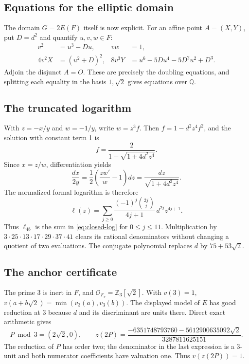 \documentclass[11pt]{article}
\theoremstyle{definition}
\newcommand{\Q}{\mathbb Q}\newcommand{\Z}{\mathbb Z}
\begin{document}
\subsection{Equations for the elliptic domain}

The domain \(G=2E(F)\) itself is now explicit. For an affine point
\(A=(X,Y)\), put \(D=d^2\) and quantify \(u,v,w\in F\):
\begin{align*}
 v^2&=u^3-Du,&vw&=1,\\
 4v^2X&=(u^2+D)^2,&
 8v^3Y&=u^6-5Du^4-5D^2u^2+D^3.
\end{align*}
Adjoin the disjunct \(A=O\). These are precisely the doubling
equations, and splitting each equality in the basis \(1,\sqrt2\)
gives equations over \(\Q\).

\subsection{The truncated logarithm}

With \(z=-x/y\) and \(w=-1/y\), write \(w=z^3f\). Then
\(f=1-d^2z^4f^2\), and the solution with constant term 1 is
\[
 f=\frac{2}{1+\sqrt{1+4d^2z^4}}.
\]
Since \(x=z/w\), differentiation yields
\[
 \frac{dx}{2y}
 =\frac12\left(\frac{zw'}w-1\right)dz
 =\frac{dz}{\sqrt{1+4d^2z^4}}.
\]
The normalized formal logarithm is therefore
\begin{equation}\label{eq:closed-log}
 \ell(z)=\sum_{j\ge0}
       \frac{(-1)^j\binom{2j}{j}}{4j+1}\,d^{2j}z^{4j+1}.
\end{equation}
Thus \(\ell_{48}\) is the sum in \eqref{eq:closed-log} for
\(0\le j\le11\). Multiplication by
\(3\cdot25\cdot13\cdot17\cdot29\cdot37\cdot41\) clears its
rational denominators without changing a quotient of two evaluations.
The conjugate polynomial replaces \(d\) by \(75+53\sqrt2\).

\subsection{The anchor certificate}\label{sec:anchor-certificate}

The prime 3 is inert in \(F\), and
\(\mathcal O_{F_v}=\Z_3[\sqrt2]\). With \(v(3)=1\),
\(v(a+b\sqrt2)=\min(v_3(a),v_3(b))\).
The displayed model of \(E\) has good reduction at 3 because
\(d\) and its discriminant are units there. Direct exact arithmetic gives
\[
 P\bmod3=(2\sqrt2,0),\qquad
 z(2P)=\frac{-6351748793760-5612900635092\sqrt2}{3287811625151}.
\]
The reduction of \(P\) has order two; the denominator in the last
expression is a 3-unit and both numerator coefficients have valuation
one. Thus \(v(z(2P))=1\).
\end{document}
